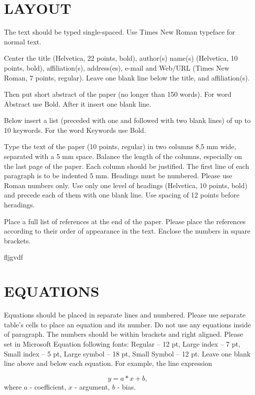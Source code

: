 \documentclass{ieeeijc}
\begin{document}
\section{LAYOUT}

The text should be typed single-spaced. Use Times New Roman typeface for normal text.

Center the title (Helvetica, 22 points, bold), author(s) name(s) (Helvetica, 10 points, bold), affiliation(s), address(es), e-mail and Web/URL (Times New Roman, 7 points, regular). Leave one blank line below the title, and affiliation(s).

Then put short abstract of the paper (no longer than 150 words). For word Abstract use Bold. After it insert one blank line.

Below insert a list (preceded with one and followed with two blank lines) of up to 10 keywords. For the word Keywords use Bold.
 
Type the text of the paper (10 points, regular) in two columns 8,5 mm wide, separated with a 5 mm space. Balance the length of the columns, especially on the last page of the paper. Each column should be justified. The first line of each paragraph is to be indented 5 mm. Headings must be numbered. Please use Roman numbers only. Use only one level of headings (Helvetica, 10 points, bold) and precede each of them with one blank line. Use spacing of 12 points before heradings.

Place a full list of references at the end of the paper. Please place the references according to their order of appearance in the text. Enclose the numbers in square brackets.

fljgvdf

\section{EQUATIONS}
\label{sec:equations}

Equations should be placed in separate lines and numbered. Please use separate table's cells to place an equation and its number. Do not use any equations inside of paragraph. The numbers should be within brackets and right aligned. Please set in Microsoft Equation following fonts: Regular – 12 pt, Large index – 7 pt, Small index – 5 pt, Large symbol – 18 pt, Small Symbol – 12 pt. Leave one blank line above and below each equation. For example, the line expression

\begin{equation}
	y=a*x+b,
\end{equation}
where ${a}$ - coefficient, ${x}$ - argument, ${b}$ - bias.
\end{document}
